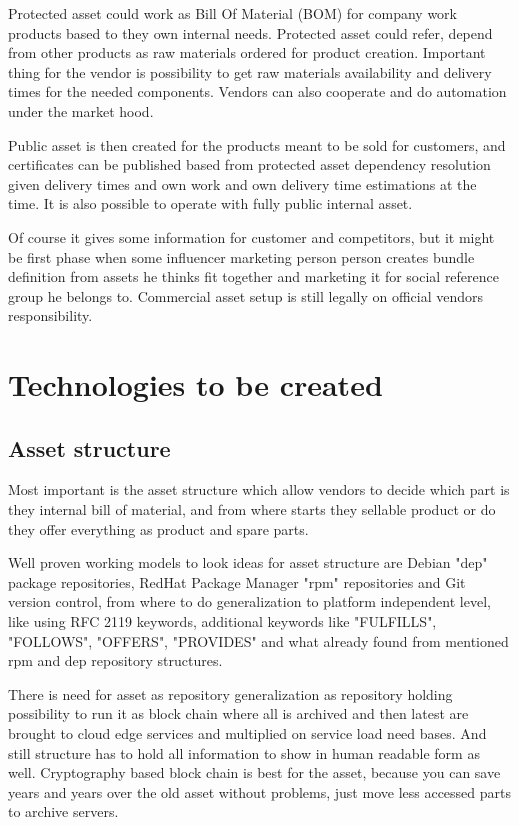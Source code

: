 Protected asset could work as Bill Of Material (BOM) for company work products
based to they own internal needs. Protected asset could refer, depend from
other products as raw materials ordered for product creation. Important thing
for the vendor is possibility to get raw materials availability and delivery
times for the needed components. Vendors can also cooperate and  do automation
under the market hood.

Public asset is then created for the products meant to be sold for customers,
and certificates can be published based from protected asset dependency
resolution given delivery times and own work and own delivery time estimations
at the time. It is also possible to operate with fully public internal asset.

Of course it gives some information for customer and competitors, but it might
be first phase when some influencer marketing person person creates bundle
definition from assets he thinks fit together and marketing it for social
reference group he belongs to. Commercial asset setup is still legally on
official vendors responsibility.



\section{Technologies to be created}
\label{technologies}

\subsection{Asset structure}
\label{asset_structure}
Most important is the asset structure which allow vendors to decide which part
is they internal bill of material, and from where starts they sellable product
or do they offer everything as product and spare parts.

Well proven working models to look ideas for asset structure are Debian "dep"
package repositories, RedHat Package Manager "rpm" repositories and Git
version control, from where to do generalization to platform independent
level, like using RFC 2119\cite{rfc2119} keywords, additional keywords like
"FULFILLS", "FOLLOWS", "OFFERS", "PROVIDES" and what already found from
mentioned rpm and dep repository structures.

There is need for asset as repository generalization as repository holding
possibility to run it as block chain where all is archived and then latest are
brought to cloud edge services and multiplied on service load need bases. And
still structure has to hold all information to show in human readable form as
well. Cryptography based block chain is best for the asset, because you can
save years and years over the old asset without problems, just move less
accessed parts to archive servers.

